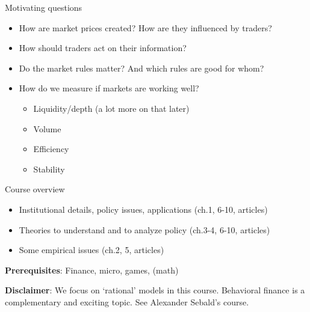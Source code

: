 \documentclass[english,10pt
,aspectratio=169
]{beamer}
\begin{document}
\begin{frame}{Motivating questions}
\begin{itemize}
	\item How are market prices created? How are they influenced by traders?
	\item How should traders act on their information?
	\item Do the market rules matter? And which rules are good for whom?
	\item How do we measure if markets are working well?
	\begin{itemize}
		\item Liquidity/depth (a lot more on that later)
		\item Volume
		\item Efficiency
		\item Stability
	\end{itemize}
\end{itemize}
\end{frame}


\begin{frame}{Course overview}
\begin{itemize}
	\item Institutional details, policy issues, applications (ch.1, 6-10, articles)
	\item Theories to understand and to analyze policy (ch.3-4, 6-10, articles)
	\item Some empirical issues (ch.2, 5, articles)
\end{itemize}

\textbf{Prerequisites}: Finance, micro, games, (math)

\textbf{Disclaimer}: We focus on `rational' models in this course.
Behavioral finance is a complementary and exciting topic. See
Alexander Sebald's course.
\end{frame}


\end{document}
